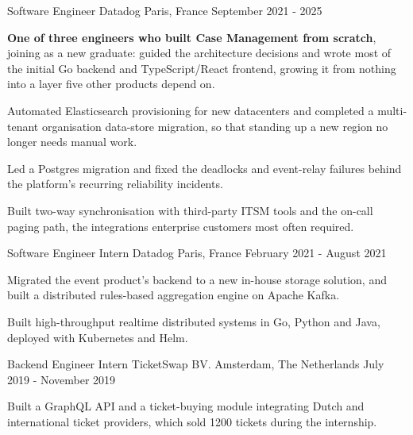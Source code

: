 \begin{cventries}
  \cventry
    {Software Engineer} %
    {Datadog} %
    {Paris, France} %
    {September 2021 - 2025} %
    {
      \begin{cvitems} %
        \item {\textbf{One of three engineers who built Case Management from scratch}, joining as a new graduate: guided the architecture decisions and wrote most of the initial Go backend and TypeScript/React frontend, growing it from nothing into a layer five other products depend on.}
        \item {Automated Elasticsearch provisioning for new datacenters and completed a multi-tenant organisation data-store migration, so that standing up a new region no longer needs manual work.}
        \item {Led a Postgres migration and fixed the deadlocks and event-relay failures behind the platform's recurring reliability incidents.}
        \item {Built two-way synchronisation with third-party ITSM tools and the on-call paging path, the integrations enterprise customers most often required.}
      \end{cvitems}
    }

  \cventry
    {Software Engineer Intern} %
    {Datadog} %
    {Paris, France} %
    {February 2021 - August 2021} %
    {
      \begin{cvitems} %
        \item {Migrated the event product's backend to a new in-house storage solution, and built a distributed rules-based aggregation engine on Apache Kafka.}
        \item {Built high-throughput realtime distributed systems in Go, Python and Java, deployed with Kubernetes and Helm.}
      \end{cvitems}
    }


  \cventry
    {Backend Engineer Intern} %
    {TicketSwap BV.} %
    {Amsterdam, The Netherlands} %
    {July 2019 - November 2019} %
    {
      \begin{cvitems} %
        \item {Built a GraphQL API and a ticket-buying module integrating Dutch and international ticket providers, which sold 1200 tickets during the internship.}
      \end{cvitems}
    }

\end{cventries}
